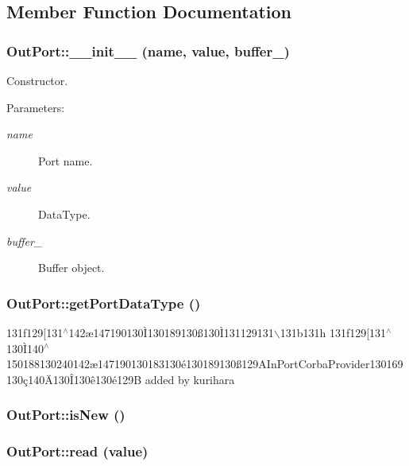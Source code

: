 \subsection{Member Function Documentation}
\subsubsection{\setlength{\rightskip}{0pt plus 5cm}Out\-Port::\_\-\_\-init\_\-\_\- (name, value, buffer\_\-)}\label{classOutPort_OutPorta0}


Constructor. 

\begin{Desc}
\item[Parameters:]
\begin{description}
\item[{\em name}]Port name. \item[{\em value}]Data\-Type. \item[{\em buffer\_\-}]Buffer object.\end{description}
\end{Desc}
\subsubsection{\setlength{\rightskip}{0pt plus 5cm}Out\-Port::get\-Port\-Data\-Type ()}\label{classOutPort_OutPorta14}


131f129[131$^\wedge$142\ae{}147190130\`{I}130189130\ss{}130\`{I}131129131$\backslash$131b131h 131f129[131$^\wedge$130\`{I}140$^\wedge$150188130240142\ae{}147190130183130\'{e}130189130\ss{}129AIn\-Port\-Corba\-Provider130169130\c{c}140\"{A}130\^{I}130\^{e}130\'{e}129B added by kurihara 

\subsubsection{\setlength{\rightskip}{0pt plus 5cm}Out\-Port::is\-New ()}\label{classOutPort_OutPorta1}


\subsubsection{\setlength{\rightskip}{0pt plus 5cm}Out\-Port::read (value)}\label{classOutPort_OutPorta3}


